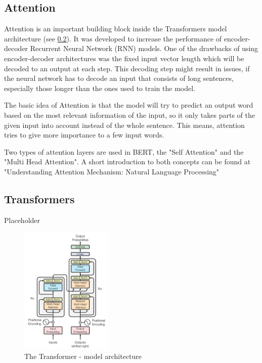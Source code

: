     
    
    \subsection{Attention}
    \label{sec:-attention}
    
    Attention is an important building block inside the Transformers model architecture (see \ref{sec:-transformers}).
    It was developed to increase the performance of encoder-decoder Recurrent Neural Network (RNN) models.
    One of the drawbacks of using encoder-decoder architectures was the fixed input vector length which will be decoded to an output at each step.
    This decoding step might result in issues, if the neural network has to decode an input that consists of long sentences, especially those longer than the ones used to train the model.

    The basic idea of Attention is that the model will try to predict an output word based on the most relevant information of the input, so it only takes parts of the given input into account instead of the whole sentence.
    This means, attention tries to give more importance to a few input words.

    Two types of attention layers are used in BERT, the "Self Attention" and the "Multi Head Attention".
    A short introduction to both concepts can be found at "Understanding Attention Mechanism: Natural Language Processing"


    
    \subsection{Transformers}
    \label{sec:-transformers}
    
    Placeholder
    
    \begin{figure}
        \caption{The Transformer - model architecture \cite[Figure 1 on page 3]{vaswani2017attention}}
        \begin{center}
            \includegraphics[width=0.39\textwidth]{figures/transformer_model_architecture.png}
        \end{center}
    \end{figure}
    
